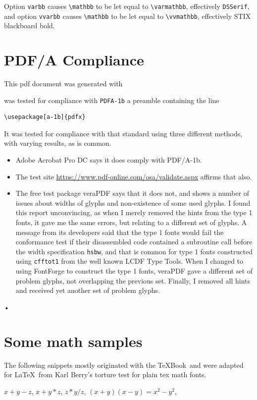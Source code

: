 \documentclass[11pt]{article}
\begin{document}
Option {\tt varbb} causes \verb|\mathbb| to be let equal to \verb|\varmathbb|, effectively {\tt DSSerif}, and option {\tt vvarbb} causes \verb|\mathbb| to be let equal to \verb|\vvmathbb|,  effectively STIX blackboard bold.

\section{PDF/A Compliance}
This pdf document was generated with 

was tested for compliance with {\tt PDFA-1b} a preamble containing the line
\begin{verbatim}
\usepackage[a-1b]{pdfx}
\end{verbatim}
It was tested for compliance with that standard using three different methods, with varying results, as is common.
\begin{itemize}
\item
\textsf{Adobe Acrobat Pro DC} says it does comply with PDF/A-1b.
\item The test site \url{https://www.pdf-online.com/osa/validate.aspx} affirms that also.
\item The free test package \textsf{veraPDF} says that it does not, and shows a number of issues about widths of glyphs and non-existence of some used glyphs. I found this report unconvincing, as when I merely removed the hints from the type 1 fonts, it gave me the same errors, but relating to a different set of glyphs. A message from its developers said that the type 1 fonts would fail the conformance test if their disassembled code contained a subroutine call before the width specification {\tt hsbw}, and that is common for type 1 fonts constructed using {\tt cfftot1} from the well known \textsf{LCDF Type Tools}. When I changed to using \textsf{FontForge} to construct the type 1 fonts, \textsf{veraPDF} gave a different set of problem glyphs, not overlapping the previous set. Finally, I removed all hints and received yet another set of problem glyphs.
\end{itemize}•


\section{Some math samples}
The following snippets mostly originated with the \TeX Book\ and were  adapted for \LaTeX\ from  Karl Berry's torture test for plain tex math fonts.

$x + y - z$, \quad $x + y * z$, \quad $z * y / z$, \quad 
$(x+y)(x-y) = x^2 - y^2$, 
\end{document}
